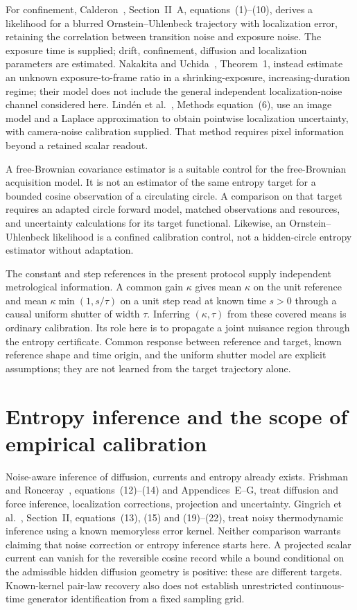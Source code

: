 For confinement, Calderon~\cite{dcCalderon2016}, Section~II~A,
equations~(1)--(10), derives a likelihood for a blurred Ornstein--Uhlenbeck
trajectory with localization error, retaining the correlation between
transition noise and exposure noise. The exposure time is supplied; drift,
confinement, diffusion and localization parameters are estimated. Nakakita and
Uchida~\cite{dgNakakita2020}, Theorem~1, instead estimate an unknown
exposure-to-frame ratio in a shrinking-exposure, increasing-duration regime;
their model does not include the general independent localization-noise
channel considered here. Lind\'en et al.~\cite{dcLinden2017}, Methods
equation~(6), use an image model and a Laplace approximation to obtain
pointwise localization uncertainty, with camera-noise calibration supplied.
That method requires pixel information beyond a retained scalar readout.

A free-Brownian covariance estimator is a suitable control for the
free-Brownian acquisition model. It is not an estimator of the same entropy
target for a bounded cosine observation of a circulating circle. A comparison
on that target requires an adapted circle forward model, matched observations
and resources, and uncertainty calculations for its target functional.
Likewise, an Ornstein--Uhlenbeck likelihood is a confined calibration control,
not a hidden-circle entropy estimator without adaptation.

The constant and step references in the present protocol supply independent
metrological information. A common gain $\kappa$ gives mean $\kappa$ on the
unit reference and mean $\kappa\min(1,s/\tau)$ on a unit step read at known
time $s>0$ through a causal uniform shutter of width $\tau$. Inferring
$(\kappa,\tau)$ from these covered means is ordinary calibration. Its role
here is to propagate a joint nuisance region through the entropy certificate.
Common response between reference and target, known reference shape and time
origin, and the uniform shutter model are explicit assumptions; they are not
learned from the target trajectory alone.

\section{Entropy inference and the scope of empirical calibration}

Noise-aware inference of diffusion, currents and entropy already exists.
Frishman and Ronceray~\cite{ogFrishman2020}, equations~(12)--(14) and
Appendices~E--G, treat diffusion and force inference, localization corrections,
projection and uncertainty. Gingrich et al.~\cite{dgGingrich2026}, Section~II,
equations~(13), (15) and (19)--(22), treat noisy thermodynamic inference using
a known memoryless error kernel. Neither comparison warrants claiming that
noise correction or entropy inference starts here. A projected scalar current
can vanish for the reversible cosine record while a bound conditional on the
admissible hidden diffusion geometry is positive: these are different targets.
Known-kernel pair-law recovery also does not establish unrestricted
continuous-time generator identification from a fixed sampling grid.

